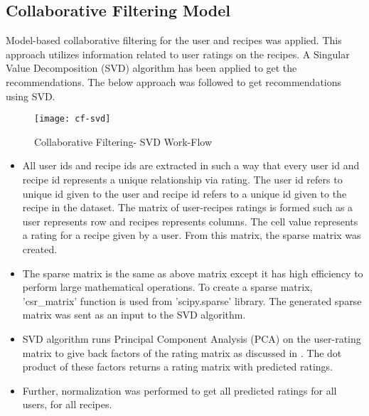 \subsection{Collaborative Filtering Model}
\label{sec:cf}
Model-based collaborative filtering for the user and recipes was applied. This approach utilizes information related to user ratings on the recipes. A Singular Value Decomposition (SVD) algorithm has been applied to get the recommendations. The below approach was followed to get recommendations using SVD.
\begin{singlespace}
\begin{figure}[H]
	\centering
	\texttt{[image: cf-svd]}
	\caption{Collaborative Filtering- SVD Work-Flow }
	\label{fig:cf-svd}
\end{figure}  
\end{singlespace}

\begin{itemize}
\item All user ids and recipe ids are extracted in such a way that every user id and recipe id represents a unique relationship via rating. The user id refers to unique id given to the user and recipe id refers to a unique id given to the recipe in the dataset. The matrix of user-recipes ratings is formed such as a user represents row and recipes represents columns. The cell value represents a rating for a recipe given by a user. From this matrix, the sparse matrix was created. 
\item The sparse matrix is the same as above matrix except it has high efficiency to perform large mathematical operations. To create a sparse matrix, 'csr\_matrix' function is used from 'scipy.sparse' library. The generated sparse matrix was sent as an input to the SVD algorithm.
\item SVD algorithm runs Principal Component Analysis (PCA) on the user-rating matrix to give back factors of the rating matrix as discussed in . The dot product of these factors returns a rating matrix with predicted ratings. 
\item Further, normalization was performed to get all predicted ratings for all users, for all recipes.
\end{itemize}

